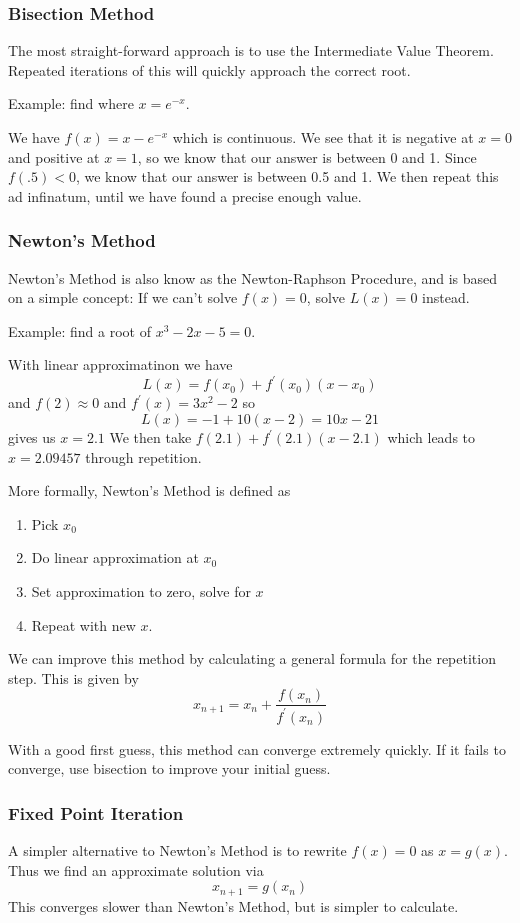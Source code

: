 \documentclass[12pt]{article}
\begin{document}
\subsubsection*{Bisection Method}
The most straight-forward approach is to use the Intermediate Value Theorem. Repeated iterations of this will quickly approach the correct root.

Example: find where $x = e^{-x}$.

We have $f(x) = x - e^{-x}$ which is continuous. We see that it is negative at $x = 0$ and positive at $x = 1$, so we know that our answer is between 0 and 1. Since $f(.5) < 0$, we know that our answer is between 0.5 and 1. We then repeat this ad infinatum, until we have found a precise enough value.

\subsubsection*{Newton's Method}
Newton's Method is also know as the Newton-Raphson Procedure, and is based on a simple concept: If we can't solve $f(x) = 0$, solve $L(x) = 0$ instead.

Example: find a root of $x^3 - 2x - 5 = 0$.

With linear approximatinon we have \[ L(x) = f(x_0) + f^\prime(x_0)(x-x_0) \] and $f(2) \approx 0$ and $f^\prime(x) = 3x^2 - 2$ so \[ L(x) = -1 + 10(x-2) = 10x - 21 \] gives us $x = 2.1$ We then take $f(2.1) + f^\prime(2.1)(x-2.1)$ which leads to $x = 2.09457$ through repetition.

More formally, Newton's Method is defined as
\begin{enumerate}
\item Pick $x_0$
\item Do linear approximation at $x_0$
\item Set approximation to zero, solve for $x$
\item Repeat with new $x$.
\end{enumerate}

We can improve this method by calculating a general formula for the repetition step. This is given by \[ x_{n+1} = x_n + \frac{f(x_n)}{f^\prime(x_n)} \]

With a good first guess, this method can converge extremely quickly. If it fails to converge, use bisection to improve your initial guess.

\subsubsection*{Fixed Point Iteration}
A simpler alternative to Newton's Method is to rewrite $f(x) = 0$ as $x = g(x)$. Thus we find an approximate solution via \[ x_{n+1} = g(x_n) \] This converges slower than Newton's Method, but is simpler to calculate.
\end{document}
